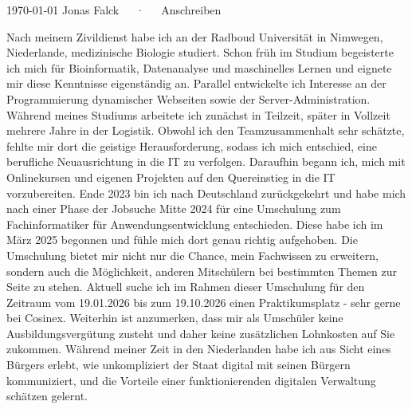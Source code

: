 \documentclass[11pt, a4paper]{awesome-cv}
\begin{document}
\vspace{-3mm}
\makecvheader[R]
\vspace{-3mm}
\makecvfooter
  {\today}
  {Jonas Falck~~~·~~~Anschreiben}
  {}

\makelettertitle


\begin{cvletter}
  \vspace{-1.5mm}
  Nach meinem Zivildienst habe ich an der Radboud Universität in Nimwegen, Niederlande, medizinische Biologie studiert. 
  Schon früh im Studium begeisterte ich mich für Bioinformatik, Datenanalyse und maschinelles Lernen und eignete mir diese Kenntnisse eigenständig an. 
  Parallel entwickelte ich Interesse an der Programmierung dynamischer Webseiten sowie der Server-Administration.
  Während meines Studiums arbeitete ich zunächst in Teilzeit, später in Vollzeit mehrere Jahre in der Logistik. 
  Obwohl ich den Teamzusammenhalt sehr schätzte, fehlte mir dort die geistige Herausforderung, sodass ich mich entschied, eine berufliche Neuausrichtung in die IT zu verfolgen.
  Daraufhin begann ich, mich mit Onlinekursen und eigenen Projekten auf den Quereinstieg in die IT vorzubereiten.
  Ende 2023 bin ich nach Deutschland zurückgekehrt und habe mich nach einer Phase der Jobsuche Mitte 2024 für eine Umschulung zum Fachinformatiker für Anwendungsentwicklung entschieden.
  Diese habe ich im März 2025 begonnen und fühle mich dort genau richtig aufgehoben.
  Die Umschulung bietet mir nicht nur die Chance, mein Fachwissen zu erweitern, sondern auch die Möglichkeit, anderen Mitschülern bei bestimmten Themen zur Seite zu stehen.
  Aktuell suche ich im Rahmen dieser Umschulung für den Zeitraum vom 19.01.2026 bis zum 19.10.2026 einen Praktikumsplatz - sehr gerne bei Cosinex.
  Weiterhin ist anzumerken, dass mir als Umschüler keine Ausbildungsvergütung zusteht und daher keine zusätzlichen Lohnkosten auf Sie zukommen.
  \vspace{-1.5mm}
  Während meiner Zeit in den Niederlanden habe ich aus Sicht eines Bürgers erlebt, wie unkompliziert der Staat digital mit seinen Bürgern kommuniziert, und die Vorteile einer funktionierenden digitalen Verwaltung schätzen gelernt.

\end{cvletter}
\end{document}
